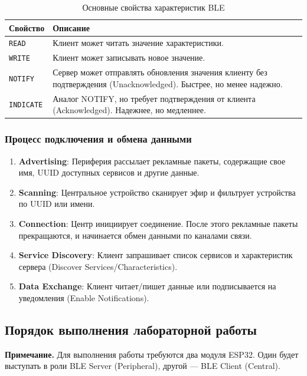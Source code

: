 \begin{table}[htbp]
\caption{Основные свойства характеристик BLE}
\centering
\begin{tabularx}{\textwidth}{lX}
\toprule
\textbf{Свойство} & \textbf{Описание} \\
\midrule
\texttt{READ} & Клиент может читать значение характеристики. \\
\texttt{WRITE} & Клиент может записывать новое значение. \\
\texttt{NOTIFY} & Сервер может отправлять обновления значения клиенту без подтверждения (Unacknowledged). Быстрее, но менее надежно. \\
\texttt{INDICATE} & Аналог NOTIFY, но требует подтверждения от клиента (Acknowledged). Надежнее, но медленнее. \\
\bottomrule
\end{tabularx}
\end{table}

\subsubsection{Процесс подключения и обмена данными}
\begin{enumerate}
    \item \textbf{Advertising}: Периферия рассылает рекламные пакеты, содержащие свое имя, UUID доступных сервисов и другие данные.
    \item \textbf{Scanning}: Центральное устройство сканирует эфир и фильтрует устройства по UUID или имени.
    \item \textbf{Connection}: Центр инициирует соединение. После этого рекламные пакеты прекращаются, и начинается обмен данными по каналами связи.
    \item \textbf{Service Discovery}: Клиент запрашивает список сервисов и характеристик сервера (Discover Services/Characteristics).
    \item \textbf{Data Exchange}: Клиент читает/пишет данные или подписывается на уведомления (Enable Notifications).
\end{enumerate}

\subsection{Порядок выполнения лабораторной работы}

\textbf{Примечание.} Для выполнения работы требуются два модуля ESP32. Один будет выступать в роли BLE Server (Peripheral), другой — BLE Client (Central).

